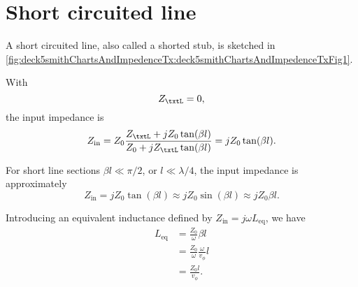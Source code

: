 %
%

\section{Short circuited line}
A short circuited line, also called a shorted stub, is sketched in \cref{fig:deck5smithChartsAndImpedenceTx:deck5smithChartsAndImpedenceTxFig1}.


With
\begin{equation}\label{eqn:uwavesDeck5SmithChartCore:20}
Z_\txtL = 0,
\end{equation}
the input impedance is
\begin{equation}\label{eqn:uwavesDeck5SmithChartCore:40}
Z_{\textrm{in}}
= Z_0 \frac{ Z_\txtL + j Z_0 \tan(\beta l) }{ Z_0 + j Z_\txtL \tan(\beta l)}
= j Z_0 \tan(\beta l).
\end{equation}

%
%

For short line sections \( \beta l \ll \pi/2 \), or \( l \ll \lambda/4 \), the input impedance is approximately
\begin{equation}\label{eqn:uwavesDeck5SmithChartCore:80}
Z_{\textrm{in}}
= j Z_0 \tan(\beta l)
\approx j Z_0 \sin(\beta l)
\approx j Z_0 \beta l.
\end{equation}

Introducing an equivalent inductance defined by \( Z_{\textrm{in}} = j \omega L_{\mathrm{eq}} \), we have
\begin{equation}\label{eqn:uwavesDeck5SmithChartCore:100}
\begin{aligned}
L_{\mathrm{eq}}
&=
\frac{Z_0}{\omega} \beta l
\\ &=
\frac{Z_0}{\omega} \frac{\omega}{v_\phi} l
\\ &=
\frac{Z_0 l}{v_\phi}.
\end{aligned}
\end{equation}


